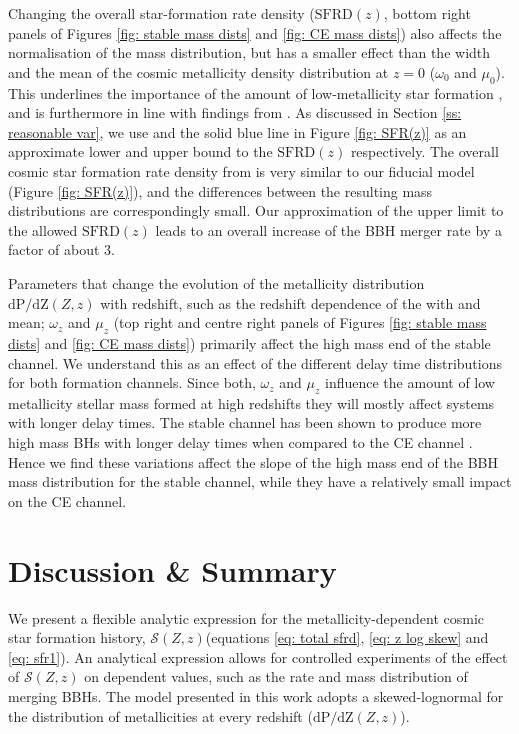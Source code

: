 \documentclass[twocolumn]{aastex631}
\newcommand{\SFRDzZ}{\ensuremath{\mathcal{S}(Z,z)}\xspace}
\newcommand{\SFRDz}{\ensuremath{\mathrm{SFRD}(z)}\xspace}
\newcommand{\dpdZ}{\ensuremath{\mathrm{dP/dZ}(Z,z)}\xspace}
\begin{document}
Changing the overall star-formation rate density (\SFRDz, bottom right panels of Figures \ref{fig: stable mass dists} and \ref{fig: CE mass dists}) also affects the normalisation of the mass distribution, but has a smaller effect than the width and the mean of the cosmic metallicity density distribution at $z=0$ ($\omega_0$ and $\mu_0$). This underlines the importance of the amount of low-metallicity star formation \citep[e.g.,][]{chruslinska2022_review}, and is furthermore in line with findings from \cite{Tang+2020}.
As discussed in Section \ref{ss: reasonable var}, we use \cite{Madau+2017} and the solid blue line in Figure \ref{fig: SFR(z)} as an approximate lower and upper bound to the \SFRDz respectively. 
The overall cosmic star formation rate density from \cite{Madau+2017} is very similar to our fiducial model (Figure \ref{fig: SFR(z)}), and the differences between the resulting mass distributions are correspondingly small. Our approximation of the upper limit to the allowed \SFRDz leads to an overall increase of the BBH merger rate by a factor of about 3. 


Parameters that change the evolution of the metallicity distribution \dpdZ with redshift, such as the redshift dependence of the with and mean; $\omega_z$ and $\mu_z$ (top right and centre right panels of Figures \ref{fig: stable mass dists} and \ref{fig: CE mass dists}) primarily affect the high mass end of the stable channel. 
We understand this as an effect of the different delay time distributions for both formation channels. Since both, $\omega_z$ and $\mu_z$ influence the amount of low metallicity stellar mass formed at high redshifts they will mostly affect systems with longer delay times. The stable channel has been shown to produce more high mass BHs with longer delay times when compared to the CE channel \citep{vanson+2022, Briel+2022}. 
Hence we find these variations affect the slope of the high mass end of the BBH mass distribution for the stable channel, while they have a relatively small impact on the CE channel.



\section{Discussion \& Summary \label{sec: summary}}
We present a flexible analytic expression for the metallicity-dependent cosmic star formation history, \SFRDzZ (equations \ref{eq: total sfrd}, \ref{eq: z log skew} and \ref{eq: sfr1}). An analytical expression allows for controlled experiments of the effect of \SFRDzZ on dependent values, such as the rate and mass distribution of merging BBHs. The model presented in this work adopts a skewed-lognormal for the distribution of metallicities at every redshift (\dpdZ). 
\end{document}
